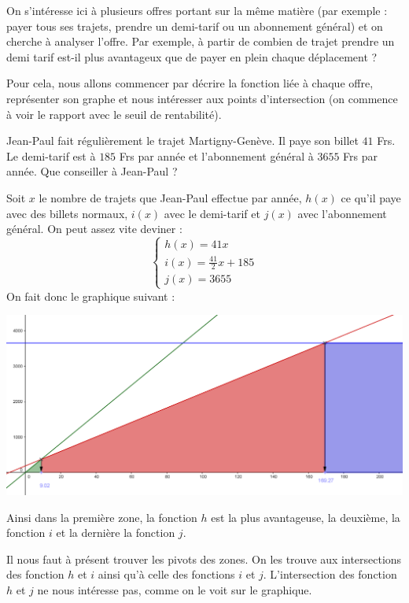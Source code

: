 On s'intéresse ici à plusieurs offres portant sur la même matière (par exemple : payer tous ses  trajets, prendre un demi-tarif ou un abonnement général) et on cherche à analyser l'offre. Par exemple, à partir de combien de trajet prendre un demi tarif est-il plus avantageux que de payer en plein chaque déplacement ?

Pour cela, nous allons commencer par décrire la fonction liée à chaque offre, représenter son graphe et nous intéresser aux points d'intersection (on commence à voir le rapport avec le seuil de rentabilité).

\begin{exemple}
Jean-Paul fait régulièrement le trajet Martigny-Genève. Il paye son billet $41$ Frs. Le demi-tarif est à $185$ Frs par année et l'abonnement général à $3655$ Frs par année. Que conseiller à Jean-Paul ?

Soit $x$ le nombre de trajets que Jean-Paul effectue par année, $h(x)$ ce qu'il paye avec des billets normaux, $i(x)$ avec le demi-tarif et $j(x)$ avec l'abonnement général. On peut assez vite deviner :
$$
\left\{
\begin{array}{l}
h(x) = 41 x\\
i(x) = \frac{41}{2} x + 185\\
j(x) = 3655
\end{array}
\right.
$$
On fait donc le graphique suivant :
\begin{center}
\includegraphics[width = 0.9 \textwidth]{rentabilite/comparatif.png}
\end{center}
Ainsi dans la première zone, la fonction $h$ est la plus avantageuse, la deuxième, la fonction $i$ et la dernière la fonction $j$.

Il nous faut à présent trouver les pivots des zones. On les trouve aux intersections des fonction $h$ et $i$ ainsi qu'à celle des fonctions $i$ et $j$. L'intersection des fonction $h$ et $j$ ne nous intéresse pas, comme on le voit sur le graphique.


\end{exemple}

